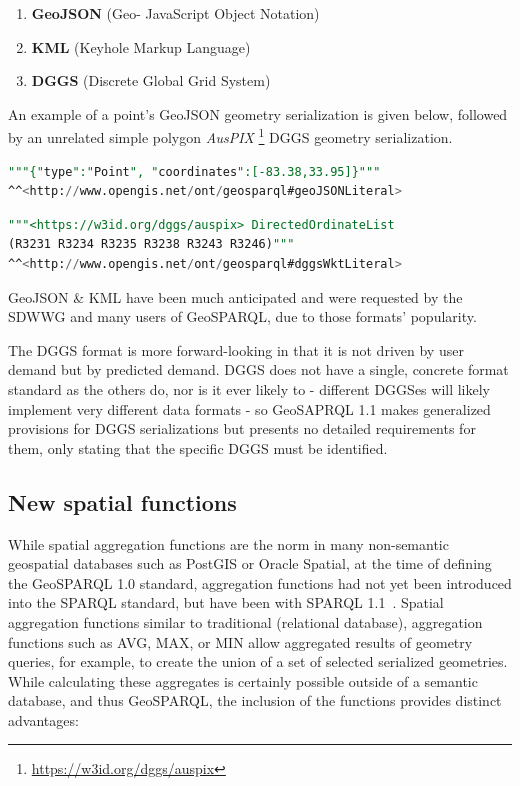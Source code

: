 \documentclass[runningheads]{llncs}
\begin{document}
\begin{enumerate}
    \item \textbf{GeoJSON} (Geo- JavaScript Object Notation)~\cite{butler2016geojson}
    \item \textbf{KML} (Keyhole Markup Language)~\cite{nolan2014keyhole} 
    \item \textbf{DGGS} (Discrete Global Grid System)~\cite{sahr1998discrete}
\end{enumerate} 

An example of a point's GeoJSON geometry serialization is given below, followed by an unrelated simple polygon \textit{AusPIX}
\footnote{\url{https://w3id.org/dggs/auspix}} DGGS geometry serialization.

\small
\begin{lstlisting}[caption=GeoJSON geometry serialization example,label=lst:geojsonliteral,language=sql,frame=single,basicstyle=\ttfamily,showstringspaces=false]
"""{"type":"Point", "coordinates":[-83.38,33.95]}"""
^^<http://www.opengis.net/ont/geosparql#geoJSONLiteral>
\end{lstlisting}

\begin{lstlisting}[caption=AusPIX DGGS geometry serialization example,label=lst:geodggsWktliteral,language=sql,frame=single,basicstyle=\ttfamily,showstringspaces=false]
"""<https://w3id.org/dggs/auspix> DirectedOrdinateList 
(R3231 R3234 R3235 R3238 R3243 R3246)"""
^^<http://www.opengis.net/ont/geosparql#dggsWktLiteral>
\end{lstlisting}
\normalsize

GeoJSON \& KML have been much anticipated and were requested by the SDWWG and many users of 
GeoSPARQL, due to those formats' popularity.

The DGGS format is more forward-looking in that it is not driven by user demand but by predicted demand.
DGGS does not have a single, concrete format standard as the others do, nor is it ever likely to - different DGGSes will 
likely implement very different data formats - so GeoSAPRQL 1.1 makes generalized provisions for DGGS serializations but 
presents no detailed requirements for them, only stating that the specific DGGS must be identified.

\subsection{New spatial functions}\label{sec:newfunctions}
While spatial aggregation functions are the norm in many non-semantic geospatial databases such as PostGIS or Oracle Spatial, 
at the time of defining the GeoSPARQL 1.0 standard, aggregation functions had not yet been introduced into the SPARQL standard,
but have been with SPARQL 1.1~\cite{w3c_sparql_working_group_sparql_2013}. Spatial aggregation functions 
similar to traditional (relational database), aggregation functions such as AVG, MAX, or MIN allow aggregated results of geometry 
queries, for example, to create the union of a set of selected serialized geometries. While calculating these aggregates is 
certainly possible outside of a semantic database, and thus GeoSPARQL, the inclusion of the functions provides distinct advantages:
\end{document}
